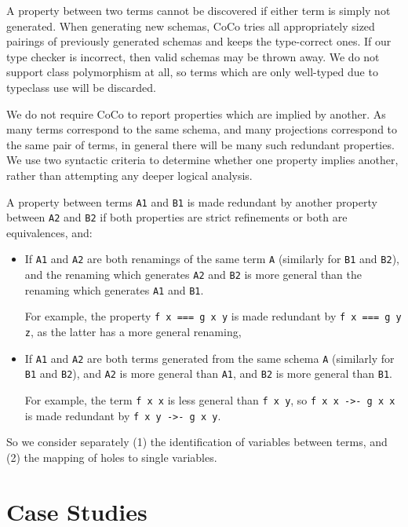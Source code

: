 A property between two terms cannot be discovered if either term is
simply not generated.  When generating new schemas, CoCo tries all
appropriately sized pairings of previously generated schemas and keeps
the type-correct ones.  If our type checker is incorrect, then valid
schemas may be thrown away.  We do not support class polymorphism at
all, so terms which are only well-typed due to typeclass use will be
discarded.

We do not require CoCo to report properties which are implied by
another.  As many terms correspond to the same schema, and many
projections correspond to the same pair of terms, in general there
will be many such redundant properties.  We use two syntactic criteria
to determine whether one property implies another, rather than
attempting any deeper logical analysis.

A property between terms \verb|A1| and \verb|B1| is made redundant by
another property between \verb|A2| and \verb|B2| if both properties
are strict refinements or both are equivalences, and:

\begin{itemize}
\item If \verb|A1| and \verb|A2| are both renamings of the same term
  \verb|A| (similarly for \verb|B1| and \verb|B2|), and the renaming
  which generates \verb|A2| and \verb|B2| is more general than the
  renaming which generates \verb|A1| and \verb|B1|.

  For example, the property \verb|f x === g x y| is made redundant by
  \verb|f x === g y z|, as the latter has a more general renaming,

\item If \verb|A1| and \verb|A2| are both terms generated from the
  same schema \verb|A| (similarly for \verb|B1| and \verb|B2|), and
  \verb|A2| is more general than \verb|A1|, and \verb|B2| is more
  general than \verb|B1|.

  For example, the term \verb|f x x| is less general than \verb|f x y|,
  so \verb|f x x ->- g x x| is made redundant by
  \verb|f x y ->- g x y|.
\end{itemize}

So we consider separately (1) the identification of variables between
terms, and (2) the mapping of holes to single variables.

\section{Case Studies}
\label{sec:coco-cases}

